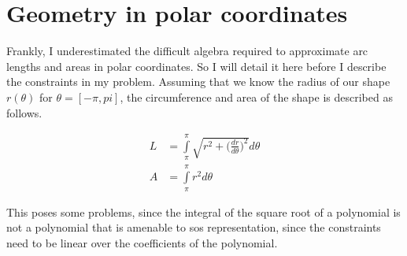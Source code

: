 \section{Geometry in polar coordinates}

Frankly, I underestimated the difficult algebra required to approximate
arc lengths and areas in polar coordinates. So I will detail it here
before I describe the constraints in my problem. Assuming that we
know the radius of our shape $r(\theta)$ for $\theta=[-\pi, pi]$,
the circumference and area of the shape is described as follows.

\begin{align}
    L & = \int\limits_{\pi}^{\pi} \sqrt{r^2 + \Big(\frac{dr}{d\theta}\Big)^2} d\theta \\
    A & = \int\limits_{\pi}^{\pi} r^2 d\theta
\end{align}

This poses some problems, since the integral of the square root of a polynomial
is not a polynomial that is amenable to \gls{sos} representation, since the
constraints need to be linear over the coefficients of the polynomial.
